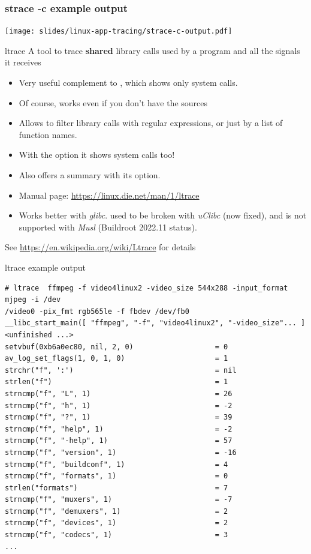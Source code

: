 \begin{frame}[fragile]
  \frametitle{strace -c example output}
  \texttt{[image: slides/linux-app-tracing/strace-c-output.pdf]}
\end{frame}

\begin{frame}{ltrace}
  A tool to trace {\bf shared} library calls used by a program and all the signals
  it receives
  \begin{itemize}
  \item Very useful complement to , which shows only system
    calls.
  \item Of course, works even if you don't have the sources
  \item Allows to filter library calls with regular expressions, or
    just by a list of function names.
  \item With the  option it shows system calls too!
  \item Also offers a summary with its  option.
  \item Manual page: \url{https://linux.die.net/man/1/ltrace}
  \item Works better with {\em glibc}.  used to be broken
        with {\em uClibc} (now fixed), and is not supported
        with {\em Musl} (Buildroot 2022.11 status).
  \end{itemize}
  See \url{https://en.wikipedia.org/wiki/Ltrace} for details
\end{frame}

\begin{frame}[fragile]{ltrace example output}
  \scriptsize
  \begin{block}{}
\begin{verbatim}
# ltrace  ffmpeg -f video4linux2 -video_size 544x288 -input_format mjpeg -i /dev
/video0 -pix_fmt rgb565le -f fbdev /dev/fb0
__libc_start_main([ "ffmpeg", "-f", "video4linux2", "-video_size"... ] <unfinished ...>
setvbuf(0xb6a0ec80, nil, 2, 0)                   = 0
av_log_set_flags(1, 0, 1, 0)                     = 1
strchr("f", ':')                                 = nil
strlen("f")                                      = 1
strncmp("f", "L", 1)                             = 26
strncmp("f", "h", 1)                             = -2
strncmp("f", "?", 1)                             = 39
strncmp("f", "help", 1)                          = -2
strncmp("f", "-help", 1)                         = 57
strncmp("f", "version", 1)                       = -16
strncmp("f", "buildconf", 1)                     = 4
strncmp("f", "formats", 1)                       = 0
strlen("formats")                                = 7
strncmp("f", "muxers", 1)                        = -7
strncmp("f", "demuxers", 1)                      = 2
strncmp("f", "devices", 1)                       = 2
strncmp("f", "codecs", 1)                        = 3
...
\end{verbatim}
\end{block}
\end{frame}

